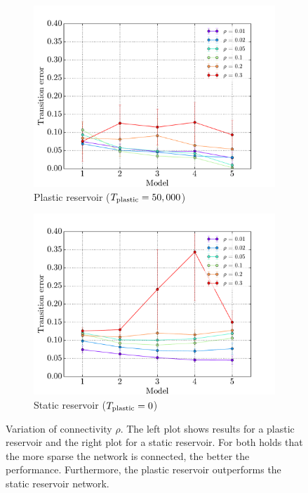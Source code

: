 \begin{figure}[!b]
    \centering
    \begin{subfigure}{0.48\textwidth}
    	\centering
        \includegraphics[width=\textwidth]{appendix/connectivity_plastic}
        \caption{Plastic reservoir ($T_{\text{plastic}} = 50,000$)}
        \label{fig:connectivity-plastic}
    \end{subfigure}
    \hfill
    \begin{subfigure}{0.48\textwidth}
    	\centering
        \includegraphics[width=\textwidth]{appendix/connectivity_static}
        \caption{Static reservoir ($T_{\text{plastic}} = 0$)}
        \label{fig:connectivity-static}
    \end{subfigure}
    \caption[Variation of connectivity]{Variation of connectivity $\rho$. The left plot shows results for a plastic reservoir and the right plot for a static reservoir. For both holds that the more sparse the network is connected, the better the performance. Furthermore, the plastic reservoir outperforms the static reservoir network.}
    \label{fig:connectivity}
\end{figure}

